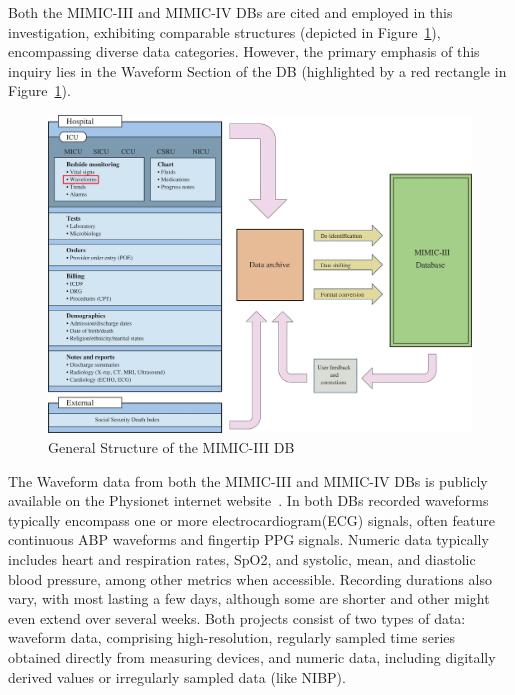 Both the MIMIC-III and MIMIC-IV DBs are cited and employed in this investigation, exhibiting comparable structures (depicted in Figure~\ref{fig:mimic_structure}), encompassing diverse data categories.
However, the primary emphasis of this inquiry lies in the Waveform Section of the DB (highlighted by a red rectangle in Figure~\ref{fig:mimic_structure}).

\begin{figure}[h]
    \centering
    \includegraphics[scale=0.3]{images/mimic/mimic_structure}
    \caption{General Structure of the MIMIC-III DB~\cite{johnsonMIMICIIIFreelyAccessible2016}}
    \label{fig:mimic_structure}
\end{figure}

The Waveform data from both the MIMIC-III and MIMIC-IV DBs is publicly available on the Physionet internet website~\cite{moodyMIMICIIIWaveformDatabase2017, moodyMIMICIVWaveformDatabase}.
In both DBs recorded waveforms typically encompass one or more electrocardiogram(ECG) signals, often feature continuous ABP waveforms and fingertip PPG signals.
Numeric data typically includes heart and respiration rates, SpO2, and systolic, mean, and diastolic blood pressure, among other metrics when accessible.
Recording durations also vary, with most lasting a few days, although some are shorter and other might even extend over several weeks.
Both projects consist of two types of data: waveform data, comprising high-resolution, regularly sampled time series obtained directly from measuring devices, and numeric data, including digitally derived values or irregularly sampled data (like NIBP).

